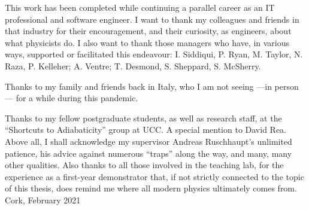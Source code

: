 {
  This work has been completed while continuing a parallel career
  as an IT professional and software engineer.
  I want to thank my
  colleagues and friends in that industry for their encouragement,
  and their curiosity,
  as engineers,
  about what physicists do.
  I also want to thank those managers
  who have, in various ways, supported or facilitated this endeavour:
  I. Siddiqui, P. Ryan, M. Taylor, N. Raza, P. Kelleher;
  A. Ventre;
  T. Desmond, S. Sheppard, S. McSherry.
  
  Thanks to my family and friends back in Italy,
  who I am not seeing ---in person--- for a while during this pandemic.

  Thanks to my fellow postgraduate students,
  as well as research staff,
  at the ``Shortcuts to Adiabaticity'' group at UCC.
  A special mention to David Rea.
  Above all, I shall acknowledge my supervisor Andreas Ruschhaupt's unlimited patience,
  his advice against numerous ``traps'' along the way, and many, many other qualities.
  Also thanks to all those involved in the teaching lab, for the experience as a
  first-year demonstrator that,
  if not strictly connected to the topic of this thesis,
  does remind me where all modern physics ultimately comes from.
  \\

  Cork, February 2021
}